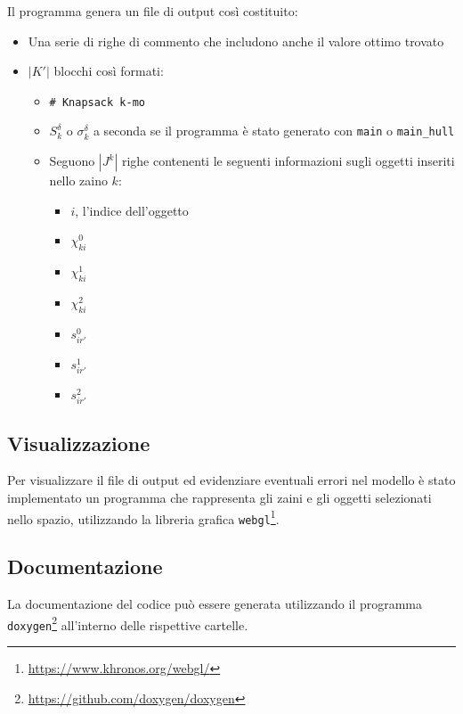 \documentclass{scrartcl}
\begin{document}
Il programma genera un file di output così costituito:
\begin{itemize}
	\item Una serie di righe di commento che includono anche il valore ottimo trovato
	\item $|K'|$ blocchi così formati:
		\begin{itemize}
			\item \verb|# Knapsack k-mo|
			\item $S_k^\delta$ o $\sigma_k^\delta$ a seconda se il programma è stato generato con \verb|main| o \verb|main_hull|
			\item Seguono $|J^k|$ righe contenenti le seguenti informazioni sugli oggetti inseriti nello zaino $k$:
			\begin{itemize}
				\item $i$, l'indice dell'oggetto
				\item $\chi_{ki}^0$
				\item $\chi_{ki}^1$
				\item $\chi_{ki}^2$
				\item $s_{ir'}^0$
				\item $s_{ir'}^1$
				\item $s_{ir'}^2$
			\end{itemize}
		\end{itemize}
\end{itemize}

\subsection{Visualizzazione}
Per visualizzare il file di output ed evidenziare eventuali errori nel modello è stato implementato un programma che rappresenta gli zaini e gli oggetti selezionati nello spazio, utilizzando la libreria grafica \verb|webgl|\footnote{\url{https://www.khronos.org/webgl/}}.

\subsection{Documentazione}
La documentazione del codice può essere generata utilizzando il programma \verb|doxygen|\footnote{\url{https://github.com/doxygen/doxygen}} all'interno delle rispettive cartelle.
\end{document}
